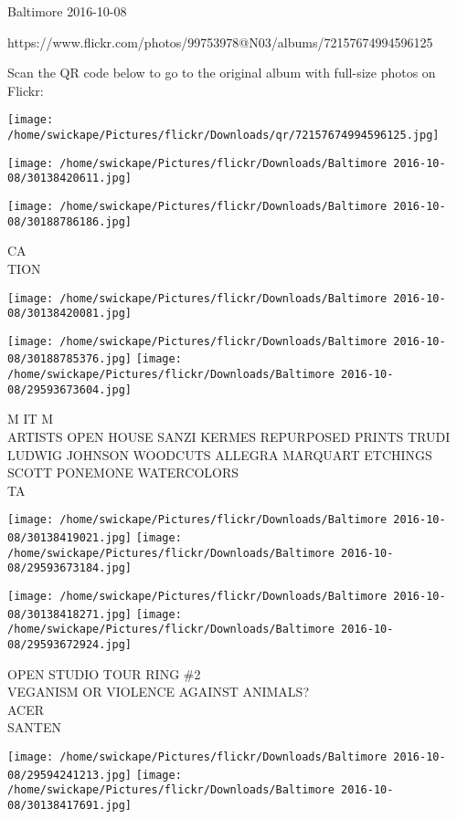 \documentclass[10pt,letterpaper]{article}
\begin{document}
Baltimore 2016-10-08

https://www.flickr.com/photos/99753978@N03/albums/72157674994596125

Scan the QR code below to go to the original album with full-size photos on Flickr:

\texttt{[image: /home/swickape/Pictures/flickr/Downloads/qr/72157674994596125.jpg]}
\pagebreak

\texttt{[image: /home/swickape/Pictures/flickr/Downloads/Baltimore 2016-10-08/30138420611.jpg]}

\vspace{0.25in}
\texttt{[image: /home/swickape/Pictures/flickr/Downloads/Baltimore 2016-10-08/30188786186.jpg]}

CA\\
TION
\pagebreak

\texttt{[image: /home/swickape/Pictures/flickr/Downloads/Baltimore 2016-10-08/30138420081.jpg]}

\vspace{0.25in}
\texttt{[image: /home/swickape/Pictures/flickr/Downloads/Baltimore 2016-10-08/30188785376.jpg]}
\texttt{[image: /home/swickape/Pictures/flickr/Downloads/Baltimore 2016-10-08/29593673604.jpg]}

M IT M\\
ARTISTS OPEN HOUSE SANZI KERMES REPURPOSED PRINTS TRUDI LUDWIG JOHNSON WOODCUTS ALLEGRA MARQUART ETCHINGS SCOTT PONEMONE WATERCOLORS\\
TA
\pagebreak

\texttt{[image: /home/swickape/Pictures/flickr/Downloads/Baltimore 2016-10-08/30138419021.jpg]}
\texttt{[image: /home/swickape/Pictures/flickr/Downloads/Baltimore 2016-10-08/29593673184.jpg]}

\texttt{[image: /home/swickape/Pictures/flickr/Downloads/Baltimore 2016-10-08/30138418271.jpg]}
\texttt{[image: /home/swickape/Pictures/flickr/Downloads/Baltimore 2016-10-08/29593672924.jpg]}

OPEN STUDIO TOUR RING \#2\\
VEGANISM OR VIOLENCE AGAINST ANIMALS?\\
ACER\\
SANTEN
\pagebreak

\texttt{[image: /home/swickape/Pictures/flickr/Downloads/Baltimore 2016-10-08/29594241213.jpg]}
\texttt{[image: /home/swickape/Pictures/flickr/Downloads/Baltimore 2016-10-08/30138417691.jpg]}
\end{document}
